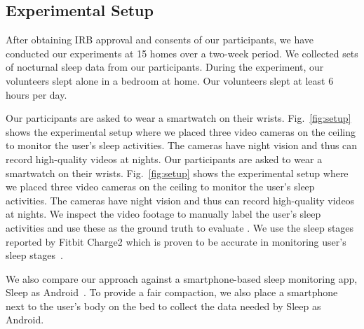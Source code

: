 \subsection{Experimental Setup}
After obtaining IRB approval and consents of our participants, we have conducted our experiments at 15 homes over a two-week period. We
collected  sets of nocturnal sleep data from our participants. During the experiment, our volunteers slept alone in a bedroom at
home. Our volunteers slept at least 6 hours per day.


Our participants are asked to wear a smartwatch on their wrists. Fig.~\ref{fig:setup} shows the experimental setup where we placed three
video cameras on the ceiling to monitor the user's sleep activities. The cameras have night vision and thus can record high-quality videos
at nights. Our participants are asked to wear a smartwatch on their wrists. Fig.~\ref{fig:setup} shows the experimental setup where we
placed three video cameras on the ceiling to monitor the user's sleep activities. The cameras have night vision and thus can record
high-quality videos at nights. We inspect the video footage to manually label the user's sleep activities and use these as the ground truth
to evaluate \systemname. We use the sleep stages reported by Fitbit Charge2 which is proven to be accurate in monitoring user's sleep
stages~\cite{}.

We also compare our approach against a smartphone-based sleep monitoring app, Sleep as Android~\cite{SleepAndroid}. To provide a fair
compaction, we also place a smartphone next to the user's body on the bed to collect the data needed by Sleep as Android.
